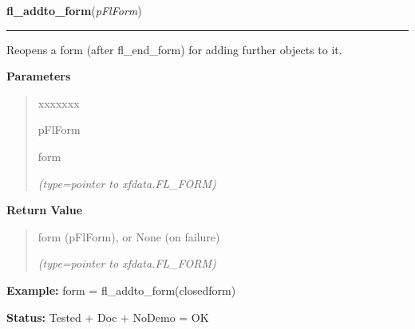 \hspace{.8\funcindent}\begin{boxedminipage}{\funcwidth}

    \raggedright \textbf{fl\_addto\_form}(\textit{pFlForm})

    \vspace{-1.5ex}

    \rule{\textwidth}{0.5\fboxrule}
\setlength{\parskip}{2ex}
    Reopens a form (after fl\_end\_form) for adding further objects to it.

\setlength{\parskip}{1ex}
      \textbf{Parameters}
      \vspace{-1ex}

      \begin{quote}
        \begin{Ventry}{xxxxxxx}

          \item[pFlForm]

          form

            {\it (type=pointer to xfdata.FL\_FORM)}

        \end{Ventry}

      \end{quote}

      \textbf{Return Value}
    \vspace{-1ex}

      \begin{quote}
      form (pFlForm), or None (on failure)

      {\it (type=pointer to xfdata.FL\_FORM)}

      \end{quote}

\textbf{Example:} form = fl\_addto\_form(closedform)



\textbf{Status:} Tested + Doc + NoDemo = OK



    \end{boxedminipage}

    \label{xformslib:flbasic:fl_make_object}

    \vspace{0.5ex}

